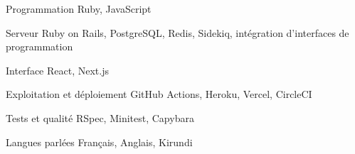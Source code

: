 
\begin{cvskills}

  \cvskill
    {Programmation} %
    {Ruby, JavaScript}

  \cvskill
    {Serveur} %
    {Ruby on Rails, PostgreSQL, Redis, Sidekiq, intégration d'interfaces de programmation}

  \cvskill
    {Interface} %
    {React, Next.js}

  \cvskill
    {Exploitation et déploiement} %
    {GitHub Actions, Heroku, Vercel, CircleCI}

  \cvskill
    {Tests et qualité} %
    {RSpec, Minitest, Capybara}

  \cvskill
    {Langues parlées} %
    {Français, Anglais, Kirundi}

\end{cvskills}
